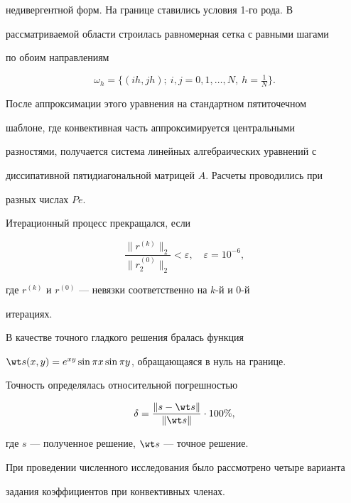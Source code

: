 недивергентной форм. На границе ставились условия 1-го рода. В 


рассматриваемой области строилась равномерная сетка с равными шагами 


по обоим направлениям 


$$ 


\omega_h=\{(ih,jh);\ i,j=0,1,\dotsc,N,\ h=\tfrac{1}{N}\}.


$$ 


 


После аппроксимации этого уравнения на стандартном пятиточечном 


шаблоне, где конвективная часть аппроксимируется центральными 


разностями, получается система линейных алгебраических уравнений с 


диссипативной пятидиагональной матрицей $A$. Расчеты проводились при 


разных числах $Pe$. 


 


Итерационный процесс прекращался, если 


$$ 


\frac{\|r^{(k)}\|_2}{\|r^{(0)}_2\|_2}<\varepsilon,\quad 


\varepsilon=10^{-6}, 


$$ 


где $r^{(k)}$ и $r^{(0)}$ --- невязки соответственно на $k$-й и $0$-й 


итерациях. 


 


В качестве точного гладкого решения бралась функция 


$\wt s(x,y)=e^{xy}\sin\pi x\sin\pi y$, обращающаяся в нуль на границе. 


Точность определялась относительной погрешностью 


$$ 


\delta=\frac{\|s-\wt s\|}{\|\wt s\|}\cdot 100\%, 


$$ 


где $s$ --- полученное решение, $\wt s$ --- точное решение. 


 


При проведении численного исследования было рассмотрено четыре варианта 


задания коэффициентов при конвективных членах. 


